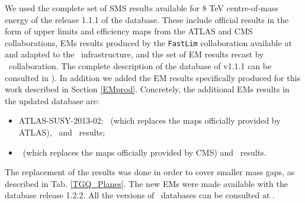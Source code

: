 \documentclass[epj,nopacs,fleqn]{svjour}
\begin{document}
We used the complete set of SMS results available for 8 TeV centre-of-mass energy of the release 1.1.1 of the database. These include official results in the form of upper limits and efficiency maps from the ATLAS and CMS collaborations, EMs results produced by the \texttt{FastLim} collaboration available at \cite{fastlim:web} and adapted to the \SMO~infrastructure, and the set of EM results recast by \SMO~collaboration. The complete description of the database of v1.1.1 can be consulted in \cite{Ambrogi:2017lov}). In addition we added the EM results specifically produced for this work described in Section \ref{EMprod}. Concretely, the additional EMs results in the updated database are:
\begin{itemize}
	\item ATLAS-SUSY-2013-02: \Ttwo~(which replaces the maps officially provided by ATLAS), \Tfive~and \TGQ~results; \
	\item \Ttwo~(which replaces the maps officially provided by CMS) and \TGQ~results.
\end{itemize}
The replacement of the \Ttwo results was done in order to cover smaller mass gaps, as described in Tab. \ref{TGQ_Planes}. The new EMs were made available with the database release 1.2.2. All the versions of \SMO~databases can be consulted at \cite{databases}.
%
\end{document}
